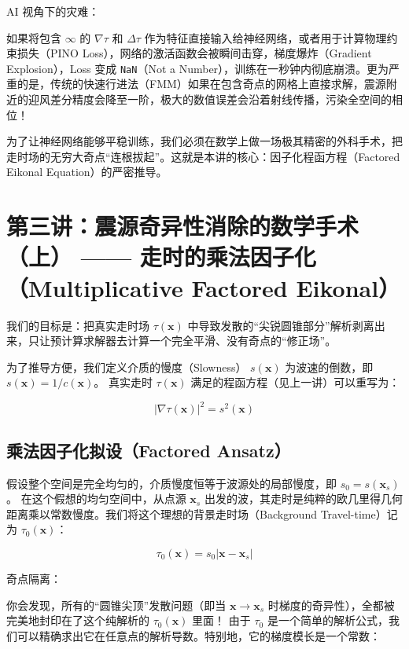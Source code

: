 \documentclass[12pt]{article}
\begin{document}
{AI 视角下的灾难：

如果将包含 $\infty$ 的 $\nabla \tau$ 和 $\Delta \tau$ 作为特征直接输入给神经网络，或者用于计算物理约束损失（PINO Loss），网络的激活函数会被瞬间击穿，梯度爆炸（Gradient Explosion），Loss 变成 \texttt{NaN}（Not a Number），训练在一秒钟内彻底崩溃。更为严重的是，传统的快速行进法（FMM）如果在包含奇点的网格上直接求解，震源附近的迎风差分精度会降至一阶，极大的数值误差会沿着射线传播，污染全空间的相位！

为了让神经网络能够平稳训练，我们必须在数学上做一场极其精密的外科手术，把走时场的无穷大奇点“连根拔起”。这就是本讲的核心：因子化程函方程（Factored Eikonal Equation）的严密推导。

\section{第三讲：震源奇异性消除的数学手术（上） —— 走时的乘法因子化（Multiplicative Factored Eikonal）}

我们的目标是：把真实走时场 $\tau(\mathbf{x})$ 中导致发散的“尖锐圆锥部分”解析剥离出来，只让预计算求解器去计算一个完全平滑、没有奇点的“修正场”。

为了推导方便，我们定义介质的慢度（Slowness） $s(\mathbf{x})$ 为波速的倒数，即 $s(\mathbf{x}) = 1/c(\mathbf{x})$。
真实走时 $\tau(\mathbf{x})$ 满足的程函方程（见上一讲）可以重写为：

\begin{equation}
|\nabla \tau(\mathbf{x})|^2 = s^2(\mathbf{x})
\label{eq:3-1}
\end{equation}

\subsection{乘法因子化拟设（Factored Ansatz）}

假设整个空间是完全均匀的，介质慢度恒等于波源处的局部慢度，即 $s_0 = s(\mathbf{x}_s)$。
在这个假想的均匀空间中，从点源 $\mathbf{x}_s$ 出发的波，其走时是纯粹的欧几里得几何距离乘以常数慢度。我们将这个理想的背景走时场（Background Travel-time）记为 $\tau_0(\mathbf{x})$：

\begin{equation}
\tau_0(\mathbf{x}) = s_0 |\mathbf{x} - \mathbf{x}_s|
\label{eq:3-2}
\end{equation}

奇点隔离：

你会发现，所有的“圆锥尖顶”发散问题（即当 $\mathbf{x} \to \mathbf{x}_s$ 时梯度的奇异性），全都被完美地封印在了这个纯解析的 $\tau_0(\mathbf{x})$ 里面！
由于 $\tau_0$ 是一个简单的解析公式，我们可以精确求出它在任意点的解析导数。特别地，它的梯度模长是一个常数：

}
\end{document}
